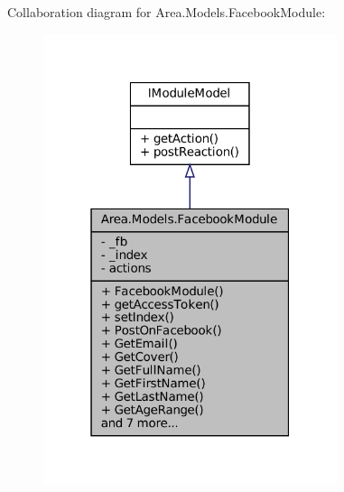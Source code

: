 Collaboration diagram for Area.\+Models.\+Facebook\+Module\+:
\nopagebreak
\begin{figure}[H]
\begin{center}
\leavevmode
\includegraphics[width=244pt]{classArea_1_1Models_1_1FacebookModule__coll__graph}
\end{center}
\end{figure}
